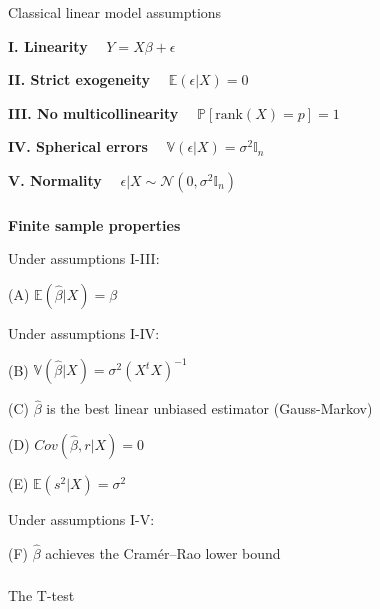 \begin{frame}[fragile] \frametitle{}

\begin{center}
{\Large Classical linear model assumptions}
\end{center}

{\bf I. Linearity} $\quad Y = X\beta + \epsilon$

{\bf II. Strict exogeneity} $\quad \mathbb{E} \left( \epsilon | X \right) = 0$

{\bf III. No multicollinearity} $\quad \mathbb{P} \left[ \text{rank} (X) = p \right] = 1$

{\bf IV. Spherical errors} $\quad \mathbb{V} \left( \epsilon | X \right) = \sigma^2 \mathbb{I}_n$

{\bf V. Normality} $\quad \epsilon | X \sim \mathcal{N} (0, \sigma^2 \mathbb{I}_n)$

\end{frame}


\begin{frame}[fragile] \frametitle{}

{\bf Finite sample properties}

Under assumptions I-III:

\hspace{1cm} (A) $\mathbb{E} (\widehat{\beta} | X) = \beta$

Under assumptions I-IV:

\hspace{1cm}  (B)  $\mathbb{V} (\widehat{\beta} | X) = \sigma^2 (X^t X)^{-1}$

\hspace{1cm}  (C) $\widehat{\beta}$ is the best linear unbiased estimator (Gauss-Markov)

\hspace{1cm}  (D) $Cov( \widehat{\beta}, r | X) = 0$

\hspace{1cm}  (E) $\mathbb{E} (s^2 | X) = \sigma^2$

Under assumptions I-V:

\hspace{1cm}  (F) $\widehat{\beta}$ achieves the Cramér–Rao lower bound

\end{frame}


\begin{frame}[fragile] \frametitle{}

\begin{flushright}
{\color{yaleblue}\sc\fontsize{1cm}{0cm}\selectfont The T-test}
\end{flushright}

\end{frame}

